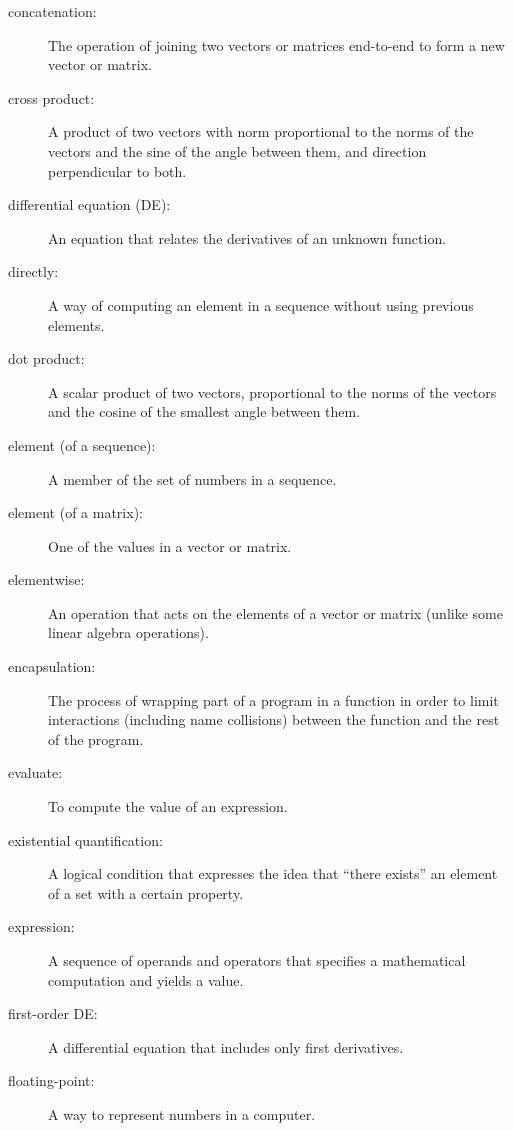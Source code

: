 \begin{description}
\item[concatenation:] The operation of joining two vectors or matrices end-to-end to
form a new vector or matrix.

\item[cross product:] A product of two vectors with norm
proportional to the norms of the vectors and the sine of the angle
between them, and direction perpendicular to both.

\item[differential equation (DE):] An equation that relates the
derivatives of an unknown function.

\item[directly:] A way of computing an element in a sequence without
using previous elements.

\item[dot product:] A scalar product of two vectors, proportional to the
norms of the vectors and the cosine of the smallest angle between them.

\item[element (of a sequence):] A member of the set of numbers in a sequence.

\item[element (of a matrix):] One of the values in a vector or matrix.

\item[elementwise:] An operation that acts on the elements
of a vector or matrix (unlike some linear algebra operations).

\item[encapsulation:] The process of wrapping part of a program in
a function in order to limit interactions (including name collisions)
between the function and the rest of the program.

\item[evaluate:] To compute the value of an expression.

\item[existential quantification:] A logical condition that expresses the idea that ``there exists'' an element of a set with a certain property.

\item[expression:] A sequence of operands and operators that specifies
a mathematical computation and yields a value.

\item[first-order DE:] A differential equation that includes only first derivatives.

\item[floating-point:] A way to represent numbers in a computer.


\end{description}
